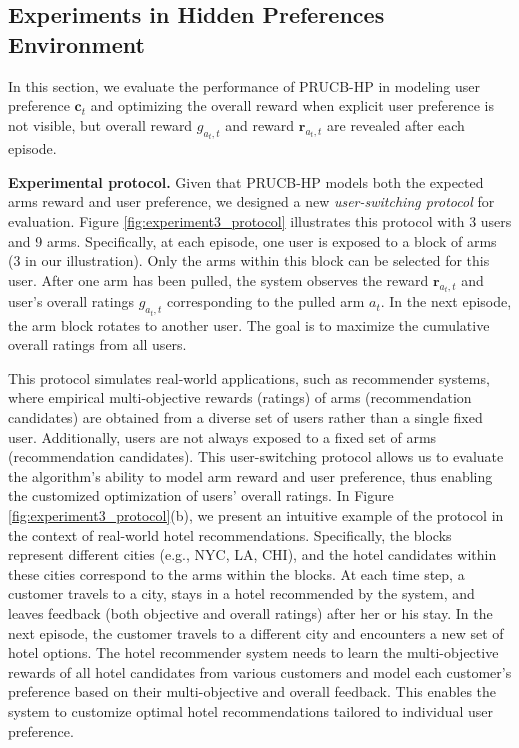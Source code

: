 \subsection{Experiments in Hidden Preferences Environment}
\label{sec:app_exp_hidden}
In this section, we evaluate the performance of PRUCB-HP in modeling user preference \(\boldsymbol{c}_t\) and optimizing the overall reward when explicit user preference is not visible, but overall reward $g_{a_t,t}$ and reward $\boldsymbol{r}_{a_t, t}$ are revealed after each episode. 

\textbf{Experimental protocol.}
Given that PRUCB-HP models both the expected arms reward and user preference, we designed a new \emph{user-switching protocol} for evaluation. Figure \ref{fig:experiment3_protocol} illustrates this protocol with 3 users and 9 arms. Specifically, at each episode, one user is exposed to a block of arms (3 in our illustration). Only the arms within this block can be selected for this user. After one arm has been pulled, the system observes the reward $\boldsymbol{r}_{a_t, t}$ and user’s overall ratings $g_{a_t,t}$ corresponding to the pulled arm $a_t$. In the next episode, the arm block rotates to another user. The goal is to maximize the cumulative overall ratings from all users.

This protocol simulates real-world applications, such as recommender systems, where empirical multi-objective rewards (ratings) of arms (recommendation candidates) are obtained from a diverse set of users rather than a single fixed user. Additionally, users are not always exposed to a fixed set of arms (recommendation candidates). This user-switching protocol allows us to evaluate the algorithm’s ability to model arm reward and user preference, thus enabling the customized optimization of users’ overall ratings.
In Figure \ref{fig:experiment3_protocol}(b), we present an intuitive example of the protocol in the context of real-world hotel recommendations. Specifically, the blocks represent different cities (e.g., NYC, LA, CHI), and the hotel candidates within these cities correspond to the arms within the blocks. At each time step, a customer travels to a city, stays in a hotel recommended by the system, and leaves feedback (both objective and overall ratings) after her or his stay. In the next episode, the customer travels to a different city and encounters a new set of hotel options. The hotel recommender system needs to learn the multi-objective rewards of all hotel candidates from various customers and model each customer’s preference based on their multi-objective and overall feedback. This enables the system to customize optimal hotel recommendations tailored to individual user preference.

